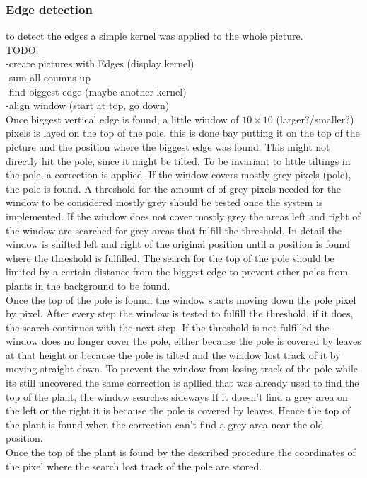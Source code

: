 \subsubsection{Edge detection}
to detect the edges a simple kernel was applied to the whole picture.\\
TODO:\\
-create pictures with Edges (display kernel)\\
-sum all coumns up\\
-find biggest edge (maybe another kernel)\\
-align window (start at top, go down)\\
Once biggest vertical edge is found, a little window of $10\times10$ (larger?/smaller?) pixels is layed on the top of the pole, this is done bay putting it on the top of the picture and the position where the biggest edge was found. This might not directly hit the pole, since it might be tilted. To be invariant to little tiltings in the pole, a correction is applied. If the window covers mostly grey pixels (pole), the pole is found. A threshold for the amount of of grey pixels needed for the window to be considered mostly grey should be tested once the system is implemented. If the window does not cover mostly grey the areas left and right of the window are searched for grey areas that fulfill the threshold. In detail the window is shifted left and right of the original position until a position is found where the threshold is fulfilled. The search for the top of the pole should be limited by a certain distance from the biggest edge to prevent other poles from plants in the background to be found.\\
Once the top of the pole is found, the window starts moving down the pole pixel by pixel. After every step the window is tested to fulfill the threshold, if it does, the search continues with the next step. If the threshold is not fulfilled the window does no longer cover the pole, either because the pole is covered by leaves at that height or because the pole is tilted and the window lost track of it by moving straight down. To prevent the window from losing track of the pole while its still uncovered the same correction is apllied that was already used to find the top of the plant, the window searches sideways If it doesn't find a grey area on the left or the right it is because the pole is covered by leaves. Hence the top of the plant is found when the correction can't find a grey area near the old position.\\ 
Once the top of the plant is found by the described procedure the coordinates of the pixel where the search lost track of the pole are stored.
